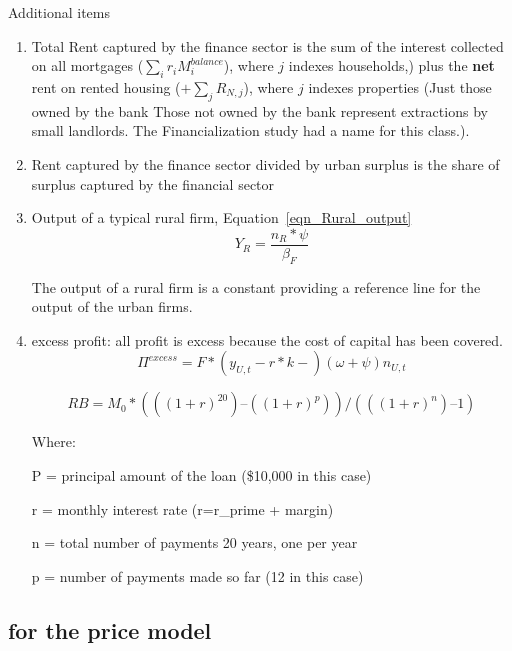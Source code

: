  Additional items 
\begin{enumerate}  
\item Total Rent captured by the finance sector is the sum of the interest collected on all mortgages ($\sum_i r_iM_i^{balance}$), where $j$ indexes households,) plus the \textbf{net} rent on rented housing ($+ \sum_j R_{N, j}$), where $j$ indexes properties (Just those owned by the bank Those not owned by the bank represent extractions by small landlords. The Financialization study had a name for this class.).

\item Rent captured by the finance sector divided by urban surplus is the share of surplus captured by the financial sector






\item Output of a  typical rural firm, Equation~\ref{eqn_Rural_output} 
\[Y_R=\frac{n_R*\psi}{\beta_F}\]

The output of a rural firm is a constant  providing a reference line for the output of the urban firms. %

  \item excess profit: all profit is excess because the cost of capital has been covered.
    \[\Pi^{excess}=F*(y_{U,t} - r*k -)(\omega+\psi)n_{U, t}\]

 \[RB = M_0 * (((1 + r)^20) – ((1 + r)^p)) / (((1 + r)^n) – 1)\]

Where:

    P = principal amount of the loan (\$10,000 in this case)
    
    r = monthly interest rate (r=r\_prime + margin)
    
    n = total number of payments 20 years, one per year
    
    p = number of payments made so far (12 in this case)   

\end{enumerate}



 \subsection{for the price model}

